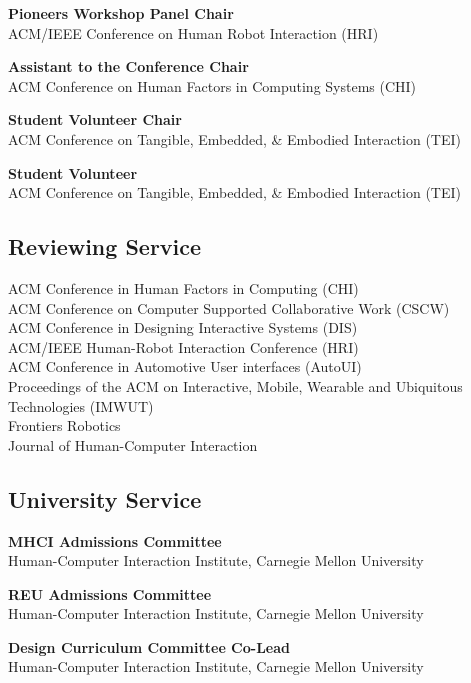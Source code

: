 \documentclass[11pt]{article} %
\begin{document}
 \textbf{Pioneers Workshop Panel Chair}\\
ACM/IEEE Conference on Human Robot Interaction (HRI)
\medskip

 \textbf{Assistant to the Conference Chair}\\
ACM Conference on Human Factors in Computing Systems (CHI)\\
\medskip

 \textbf{Student Volunteer Chair}\\
ACM Conference on Tangible, Embedded, \& Embodied Interaction (TEI)\\
\medskip

 \textbf{Student Volunteer}\\
ACM Conference on Tangible, Embedded, \& Embodied Interaction (TEI)\\
\medskip

\subsection*{Reviewing Service}
ACM Conference in Human Factors in Computing (CHI)\\
ACM Conference on Computer Supported Collaborative Work (CSCW)\\
ACM Conference in Designing Interactive Systems (DIS)\\
ACM/IEEE Human-Robot Interaction Conference (HRI)\\
ACM Conference in Automotive User interfaces (AutoUI)\\
Proceedings of the ACM on Interactive, Mobile, Wearable and Ubiquitous Technologies (IMWUT)\\
Frontiers Robotics\\
Journal of Human-Computer Interaction


\subsection*{University Service}

 \textbf{MHCI Admissions Committee}\\
Human-Computer Interaction Institute, Carnegie Mellon University
\medskip

 \textbf{REU Admissions Committee}\\
Human-Computer Interaction Institute, Carnegie Mellon University
\medskip

 \textbf{Design Curriculum Committee Co-Lead}\\
Human-Computer Interaction Institute, Carnegie Mellon University
\medskip
\end{document}
